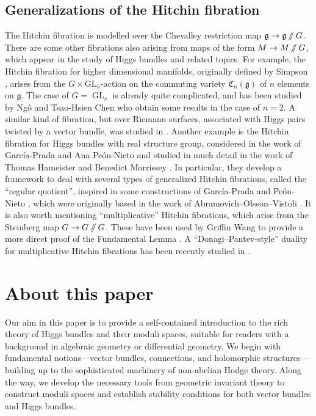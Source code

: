 \documentclass[12pt,a4paper]{amsbook}
\theoremstyle{remark} \newtheorem{rmk}[thm]{Remark}
\theoremstyle{definition} \newtheorem{defn}[thm]{Definition}
\theoremstyle{definition} \newtheorem{ex}[thm]{Example}
\theoremstyle{definition} \newtheorem{ej}{Exercise}
\newcommand{\git}{\mathbin{/\mkern-6mu/}}
\DeclareMathOperator{\GL}{GL}
\begin{document}
\subsection*{Generalizations of the Hitchin fibration} The Hitchin fibration is modelled over the Chevalley restriction map $\mathfrak{g}\rightarrow \mathfrak{g}\git G$. There are some other fibrations also arising from maps of the form $M\rightarrow M\git G$, which appear in the study of Higgs bundles and related topics. For example, the Hitchin fibration for higher dimensional manifolds, originally defined by Simpson \cite{SimpsonII}, arises from the $G\times \mathrm{GL}_{n}$-action on the commuting variety $\mathfrak{C}_n(\mathfrak{g})$ of $n$ elements on $\mathfrak{g}$. The case of $G=\GL_r$ is already quite complicated, and has been studied by Ngô and Tsao-Hsien Chen \cite{NgoChen} who obtain some results in the case of $n=2$. A similar kind of fibration, but over Riemann surfaces, associated with Higgs pairs twisted by a vector bundle, was studied in \cite{twistedpaper}. Another example is the Hitchin fibration for Higgs bundles with real structure group, considered in the work of García-Prada and Ana Peón-Nieto \cite{AnaOscar} and studied in much detail in the work of Thomas Hameister and Benedict Morrissey \cite{HameisterMorrissey}. In particular, they develop a framework to deal with several types of generalized Hitchin fibrations, called the ``regular quotient'', inspired in some constructions of García-Prada and Peón-Nieto \cite{AnaOscar}, which were originally based in the work of Abramovich--Olsson--Vistoli \cite[Appendix A]{AOV}. It is also worth mentioning ``multiplicative'' Hitchin fibrations, which arise from the Steinberg map $G\rightarrow G\git G$. These have been used by Griffin Wang to provide a more direct proof of the Fundamental Lemma \cite{Griffin}. A ``Donagi--Pantev-style'' duality for multiplicative Hitchin fibrations has been recently studied in \cite{dualitypaper}.

\section{About this paper}
Our aim in this paper is to provide a self-contained introduction to the rich theory of Higgs bundles and their moduli spaces, suitable for readers with a background in algebraic geometry or differential geometry. We begin with fundamental notions—vector bundles, connections, and holomorphic structures—building up to the sophisticated machinery of non-abelian Hodge theory. Along the way, we develop the necessary tools from geometric invariant theory to construct moduli spaces and establish stability conditions for both vector bundles and Higgs bundles.
\end{document}
